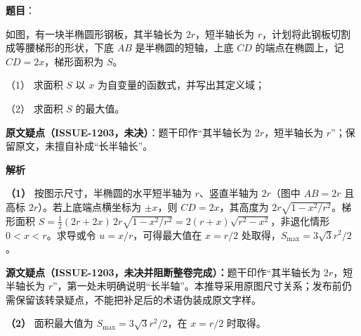 \begin{answer}

\textbf{题目}：

如图，有一块半椭圆形钢板，其半轴长为 $2r$，短半轴长为 $r$，计划将此钢板切割成等腰梯形的形状，下底 $AB$ 是半椭圆的短轴，上底 $CD$ 的端点在椭圆上，记 $CD=2x$，梯形面积为 $S$。

（1） 求面积 $S$ 以 $x$ 为自变量的函数式，并写出其定义域；

（2） 求面积 $S$ 的最大值。
\nopagebreak[4]
\begin{center}\end{center}
\nopagebreak[4]
\begin{gktip}

\textbf{原文疑点（ISSUE-1203，未决）}：题干印作“其半轴长为 $2r$，短半轴长为 $r$”；保留原文，未擅自补成“长半轴长”。
\end{gktip}

\textbf{解析}

\textbf{（1）} 按图示尺寸，半椭圆的水平短半轴为 $r$、竖直半轴为 $2r$（图中 $AB=2r$ 且高标 $2r$）。若上底端点横坐标为 $\pm x$，则 $CD=2x$，其高度为 $2r\sqrt{1-x^2/r^2}$。梯形面积
$S=\tfrac12(2r+2x)\,2r\sqrt{1-x^2/r^2}=2(r+x)\sqrt{r^2-x^2}$，非退化情形 $0<x<r$。求导或令 $u=x/r$，可得最大值在 $x=r/2$ 处取得，$S_{\max}=3\sqrt3 r^2/2$。

\textbf{源文疑点（ISSUE-1203，未决并阻断整卷完成）：}题干印作“其半轴长为 $2r$，短半轴长为 $r$”，第一处未明确说明“长半轴”。本推导采用原图尺寸关系；发布前仍需保留该转录疑点，不能把补足后的术语伪装成原文字样。

\textbf{（2）} 面积最大值为 $S_{\max}=3\sqrt3 r^2/2$，在 $x=r/2$ 时取得。



\end{answer}
